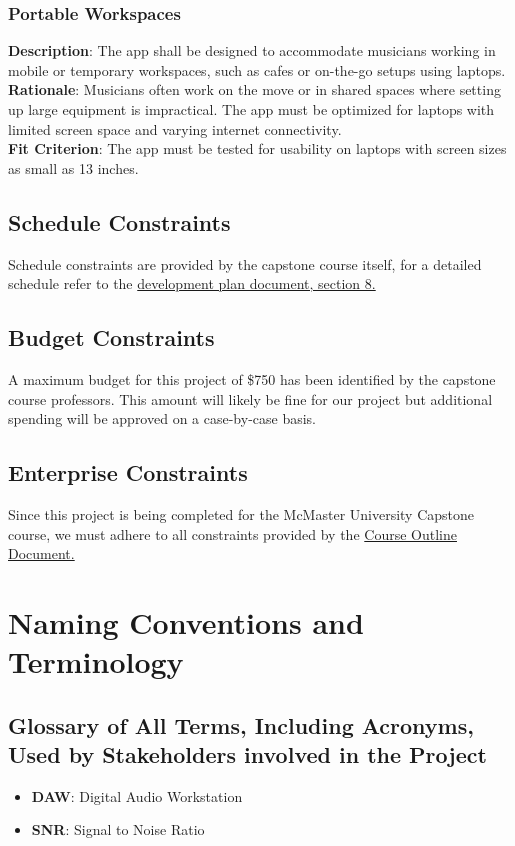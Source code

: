 \documentclass[12pt]{article}
\begin{document}
\subsubsection*{Portable Workspaces}
\textbf{Description}: The app shall be designed to accommodate musicians working in mobile or temporary workspaces, such as cafes or on-the-go setups using laptops.\\
\textbf{Rationale}: Musicians often work on the move or in shared spaces where setting up large equipment is impractical. The app must be optimized for laptops with limited screen space and varying internet connectivity.\\
\textbf{Fit Criterion}: The app must be tested for usability on laptops with screen sizes as small as 13 inches.

\subsection{Schedule Constraints}
Schedule constraints are provided by the capstone course itself, for a detailed schedule refer to the \href{https://github.com/emilyperica/ScoreGen/blob/main/docs/DevelopmentPlan/DevelopmentPlan.pdf}{development plan document, section 8.}
\subsection{Budget Constraints}
A maximum budget for this project of \$750 has been identified by the capstone course professors. This amount will likely be fine for our project but additional spending will be approved on a case-by-case basis.
\subsection{Enterprise Constraints}
Since this project is being completed for the McMaster University Capstone course, we must adhere to all constraints provided by the \href{https://gitlab.cas.mcmaster.ca/courses/capstone/-/blob/main/CourseOutline/Capstone_Outline.pdf}{Course Outline Document.}
\section{Naming Conventions and Terminology}
\subsection{Glossary of All Terms, Including Acronyms, Used by Stakeholders
involved in the Project}
\begin{itemize}
  \item \textbf{DAW}: Digital Audio Workstation
  \item \textbf{SNR}: Signal to Noise Ratio
\end{itemize}
\end{document}
